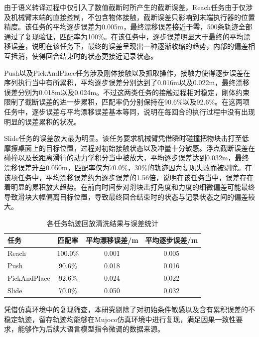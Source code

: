 由于语义转译过程中仅引入了数值截断时所产生的截断误差，Reach任务由于仅涉及机械臂末端的直接控制，不包含物体接触，截断误差只影响到末端执行器的位置精度。该任务的平均逐步误差为0.005m，最终漂移误差接近于零，500条轨迹全部通过了复现验证，匹配率为100\%。在该任务中，逐步误差明显大于最终的平均漂移误差，说明在该任务下，最终的误差呈现出一种逐渐收缩的趋势，内部的偏差相互抵消，使得回合结束时的状态更接近记录状态。

Push以及PickAndPlace任务涉及刚体接触以及抓取操作，接触力使得逐步误差在序列执行当中有所累积，平均逐步误差分别达到了0.016m以及0.022m，最终漂移误差分别为0.018m以及0.024m。不过这两类任务的接触过程相对稳定，刚体约束限制了截断误差的进一步累积，匹配率仍分别保持在90.6\%以及92.6\%。在这两项任务中，逐步误差与平均漂移误差基本等同，说明在每回合的执行过程中没有出现明显的误差累积的状况。

Slide任务的误差放大最为明显。该任务要求机械臂凭借瞬时碰撞把物块击打至低摩擦桌面上的目标位置，过程对初始接触状态以及冲量十分敏感。浮点截断误差在碰撞以及长距离滑行的动力学积分当中被放大，平均逐步误差达到0.032m，最终漂移误差升至0.050m，匹配率仅为70.0\%，30\%的轨迹因为复现失败而被剔除。在该项任务中，平均漂移误差约为逐步误差的1.56倍，说明在该任务当中，误差存在着明显的累积放大趋势。在前向时间步对滑块击打角度和力度的细微偏差可能最终导致滑块大幅偏离目标位置，导致最终回合结束时的状态与记录状态之间的偏差较大。

\begin{table}[htbp]
\centering
\caption{各任务轨迹回放清洗结果与误差统计}\label{tab:trajectory-removal-rates}
\begin{tabular}{lccc}
\toprule
任务 & 匹配率 & 平均漂移误差/m & 平均逐步误差/m \\
\midrule
Reach & 100.0\% & 0.001 & 0.005 \\
Push & 90.6\% & 0.018 & 0.016 \\
PickAndPlace & 92.6\% & 0.024 & 0.022 \\
Slide & 70.0\% & 0.050 & 0.032 \\
\bottomrule
\end{tabular}
\end{table}

凭借仿真环境中的复现筛查，本研究剔除了对初始条件敏感以及含有累积误差的不稳定轨迹，留存轨迹均能够在Mujoco仿真环境中进行复现，满足因果一致性要求，能够作为后续大语言模型指令微调的数据来源。